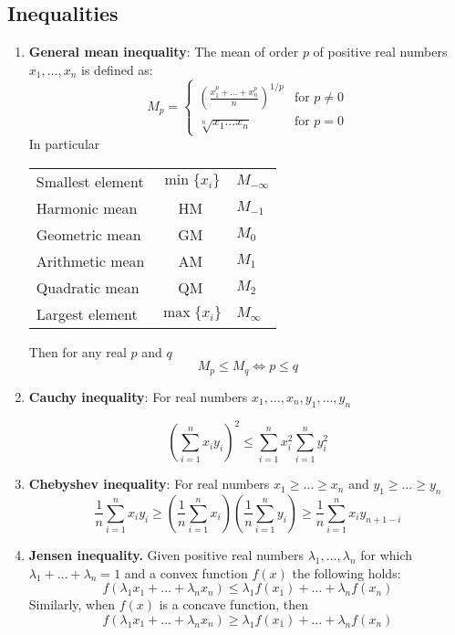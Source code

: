 \documentclass{article}
\begin{document}
  \subsection{Inequalities}
    \begin{enumerate}
    	\item \textbf{General mean inequality}:
    	The mean of order $p$ of positive real numbers $x_1,\dots,x_n$ is defined as:
    	$$M_p=
    	\begin{cases}
    	\left(\frac{x_1^p+ \dots + x_n^p}{n}\right)^{1/p} &\text{for } p \ne 0 \\
    	\sqrt[n]{x_1 \dots x_n}                           &\text{for } p=0
    	\end{cases}
    	$$
    	In particular
    	\begin{center}
    		\begin{tabular}{lcl}
    			Smallest element & $\min\{x_i\}$ & $M_{-\infty}$ \\
    			Harmonic mean & HM & $M_{-1}$ \\
    			Geometric mean & GM & $M_0$ \\
    			Arithmetic mean & AM & $M_1$ \\
    			Quadratic mean & QM & $M_2$ \\
    			Largest element & $\max\{x_i\}$ & $M_{\infty}$
    		\end{tabular}
    	\end{center}
    	Then for any real $p$ and $q$
    	$$M_p \leq M_q \iff p \leq q $$

    	\item \textbf{Cauchy inequality}:
    	For real numbers $x_1, \dots , x_n, y_1, \dots , y_n$

    	$$\left(\sum_{i=1}^{n} x_i y_i\right)^2 \leq \sum_{i=1}^{n} x_i^2 \sum_{i=1}^{n} y_i^2 $$

    	\item \textbf{Chebyshev inequality}:
    	For real numbers $x_1 \geq \dots \geq x_n$ and $y_1 \geq \dots \geq y_n$
    	$$\frac{1}{n} \sum_{i=1}^{n} x_iy_i
    	\geq
    	\left(\frac{1}{n}\sum_{i=1}^{n}x_i\right)
    	\left(\frac{1}{n}\sum_{i=1}^{n}y_i\right)
    	\geq
    	\frac{1}{n} \sum_{i=1}^{n} x_iy_{n+1-i} $$

    	\item \textbf{Jensen inequality.}
    	Given positive real numbers $\lambda_1,\hdots,\lambda_n$ for which $\lambda_1+\hdots+\lambda_n=1$  and a convex function $f(x)$ the following holds:
    	$$f(\lambda_1 x_1 + \hdots + \lambda_n x_n) \leq \lambda_1 f(x_1) + \hdots + \lambda_n f(x_n)$$
    	Similarly, when $f(x)$ is a concave function, then
    	$$f(\lambda_1 x_1 + \hdots + \lambda_n x_n) \geq \lambda_1 f(x_1) + \hdots + \lambda_n f(x_n)$$
  	\end{enumerate}
\end{document}
